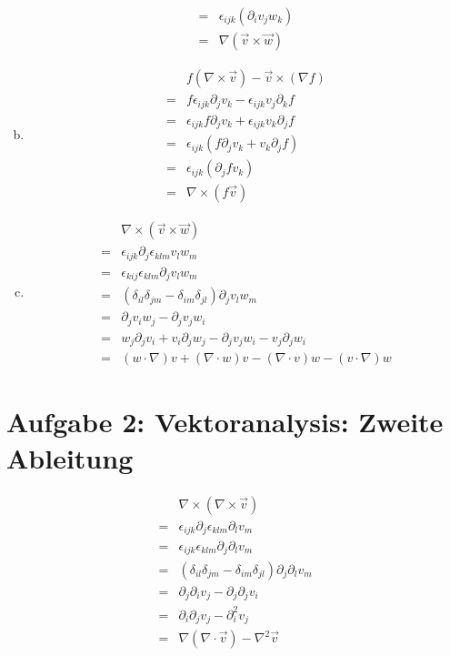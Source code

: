 \documentclass[a4paper,german,12pt,smallheadings]{scrartcl}
\begin{document}
\begin{enumerate}[a)]
\begin{align}
      =  &\epsilon_{ijk} (\partial_i v_j w_k) \\
      =  &\nabla (\vec{v} \times \vec{w})
    \end{align}
  \item
    \begin{align}
      &f(\nabla \times \vec{v}) - \vec{v} \times (\nabla f) \\
      = &f \epsilon_{ijk} \partial_j v_k - \epsilon_{ijk} v_j \partial_k f \\
      = &\epsilon_{ijk} f \partial_j v_k + \epsilon_{ijk} v_k \partial_j f \\
      = &\epsilon_{ijk} (f \partial_j v_k + v_k \partial_j f) \\
      = &\epsilon_{ijk} (\partial_j f v_k) \\
      = &\nabla \times (f \vec{v})
    \end{align}
  \item
    \begin{align}
      &\nabla \times (\vec{v} \times \vec{w}) \\
      = &\epsilon_{ijk} \partial_j \epsilon_{klm} v_l w_m \\
      = &\epsilon_{kij} \epsilon_{klm} \partial_j v_l w_m \\
      = &(\delta_{il} \delta_{jm} - \delta_{im} \delta_{jl}) \partial_j v_l w_m \\
      = &\partial_j v_i w_j - \partial_j v_j w_i \\
      = &w_j \partial_j v_i + v_i \partial_j w_j - \partial_j v_j w_i - v_j \partial_j w_i \\
      = &(w \cdot \nabla) v + (\nabla \cdot w) v - (\nabla \cdot v) w - (v \cdot \nabla) w
    \end{align}
\end{enumerate}

\section*{Aufgabe 2: Vektoranalysis: Zweite Ableitung}

\begin{align}
  &\nabla \times (\nabla \times \vec{v}) \\
  = &\epsilon_{ijk} \partial_j \epsilon_{klm} \partial_l v_m \\
  = &\epsilon_{ijk} \epsilon_{klm} \partial_j \partial_l v_m \\
  = &(\delta_{il} \delta_{jm} - \delta_{im} \delta_{jl}) \partial_j \partial_l v_m \\
  = &\partial_j \partial_i v_j - \partial_j \partial_j v_i \\
  = &\partial_i \partial_j v_j - \partial_i^2 v_j \\
  = &\nabla (\nabla \cdot \vec{v}) - \nabla^2 \vec{v}
\end{align}
\end{document}
